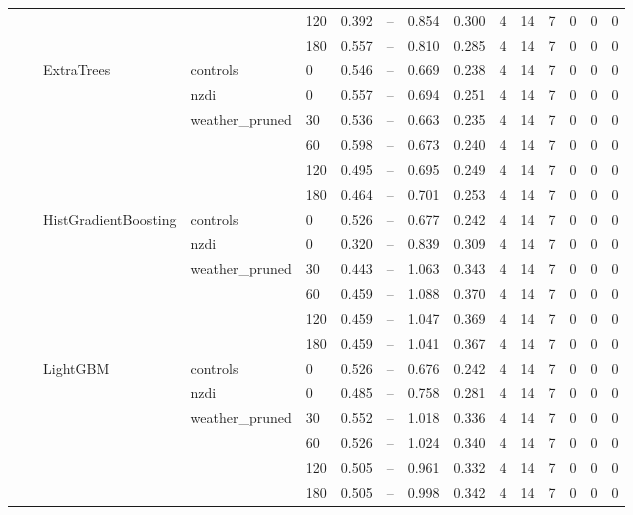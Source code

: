 \begin{longtable}{lllllrrrrrrrrrr}
 &  &  &  & 120 & 0.392 & -- & 0.854 & 0.300 & 4 & 14 & 7 & 0 & 0 & 0 \\
 &  &  &  & 180 & 0.557 & -- & 0.810 & 0.285 & 4 & 14 & 7 & 0 & 0 & 0 \\
\cline{3-15} \cline{4-15}
 &  & \multirow[t]{6}{*}{ExtraTrees} & controls & 0 & 0.546 & -- & 0.669 & 0.238 & 4 & 14 & 7 & 0 & 0 & 0 \\
\cline{4-15}
 &  &  & nzdi & 0 & 0.557 & -- & 0.694 & 0.251 & 4 & 14 & 7 & 0 & 0 & 0 \\
\cline{4-15}
 &  &  & \multirow[t]{4}{*}{weather_pruned} & 30 & 0.536 & -- & 0.663 & 0.235 & 4 & 14 & 7 & 0 & 0 & 0 \\
 &  &  &  & 60 & 0.598 & -- & 0.673 & 0.240 & 4 & 14 & 7 & 0 & 0 & 0 \\
 &  &  &  & 120 & 0.495 & -- & 0.695 & 0.249 & 4 & 14 & 7 & 0 & 0 & 0 \\
 &  &  &  & 180 & 0.464 & -- & 0.701 & 0.253 & 4 & 14 & 7 & 0 & 0 & 0 \\
\cline{3-15} \cline{4-15}
 &  & \multirow[t]{6}{*}{HistGradientBoosting} & controls & 0 & 0.526 & -- & 0.677 & 0.242 & 4 & 14 & 7 & 0 & 0 & 0 \\
\cline{4-15}
 &  &  & nzdi & 0 & 0.320 & -- & 0.839 & 0.309 & 4 & 14 & 7 & 0 & 0 & 0 \\
\cline{4-15}
 &  &  & \multirow[t]{4}{*}{weather_pruned} & 30 & 0.443 & -- & 1.063 & 0.343 & 4 & 14 & 7 & 0 & 0 & 0 \\
 &  &  &  & 60 & 0.459 & -- & 1.088 & 0.370 & 4 & 14 & 7 & 0 & 0 & 0 \\
 &  &  &  & 120 & 0.459 & -- & 1.047 & 0.369 & 4 & 14 & 7 & 0 & 0 & 0 \\
 &  &  &  & 180 & 0.459 & -- & 1.041 & 0.367 & 4 & 14 & 7 & 0 & 0 & 0 \\
\cline{3-15} \cline{4-15}
 &  & \multirow[t]{6}{*}{LightGBM} & controls & 0 & 0.526 & -- & 0.676 & 0.242 & 4 & 14 & 7 & 0 & 0 & 0 \\
\cline{4-15}
 &  &  & nzdi & 0 & 0.485 & -- & 0.758 & 0.281 & 4 & 14 & 7 & 0 & 0 & 0 \\
\cline{4-15}
 &  &  & \multirow[t]{4}{*}{weather_pruned} & 30 & 0.552 & -- & 1.018 & 0.336 & 4 & 14 & 7 & 0 & 0 & 0 \\
 &  &  &  & 60 & 0.526 & -- & 1.024 & 0.340 & 4 & 14 & 7 & 0 & 0 & 0 \\
 &  &  &  & 120 & 0.505 & -- & 0.961 & 0.332 & 4 & 14 & 7 & 0 & 0 & 0 \\
 &  &  &  & 180 & 0.505 & -- & 0.998 & 0.342 & 4 & 14 & 7 & 0 & 0 & 0 \\

\end{longtable}
